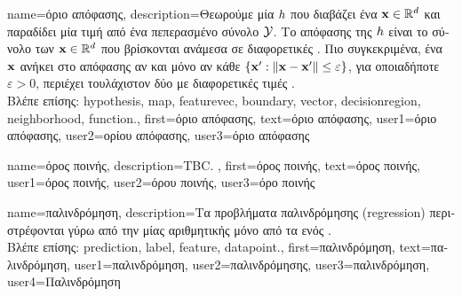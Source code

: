 {name={\foreignlanguage{greek}{όριο απόφασης}}, 
	description={\foreignlanguage{greek}{Θεωρούμε μία}  
		  $h$ \foreignlanguage{greek}{που διαβάζει ένα}   
		${\bf x} \in \mathbb{R}^{d}$ \foreignlanguage{greek}{και παραδίδει μία τιμή από ένα πεπερασμένο σύνολο $\mathcal{Y}$. 
		Το}  \foreignlanguage{greek}{απόφασης της $h$ είναι το σύνολο των}  
		${\bf x} \in \mathbb{R}^{d}$ \foreignlanguage{greek}{που βρίσκονται ανάμεσα σε διαφορετικές} . 
		\foreignlanguage{greek}{Πιο συγκεκριμένα, ένα}  ${\bf x}$ \foreignlanguage{greek}{ανήκει στο} 
		 \foreignlanguage{greek}{απόφασης αν και μόνο αν κάθε}  
		$\{ {\bf x}': \| {\bf x} - {\bf x}' \| \leq \varepsilon \}$, \foreignlanguage{greek}{για οποιαδήποτε $\varepsilon >0$, περιέχει 
		τουλάχιστον δύο}  \foreignlanguage{greek}{με διαφορετικές τιμές} .
		\\
		\foreignlanguage{greek}{Βλέπε επίσης:} \gls{hypothesis}, \gls{map}, \gls{featurevec}, \gls{boundary}, \gls{vector}, \gls{decisionregion}, 
		\gls{neighborhood}, \gls{function}.},
	first={\foreignlanguage{greek}{όριο απόφασης}},
	text={\foreignlanguage{greek}{όριο απόφασης}},
	user1={\foreignlanguage{greek}{όριο απόφασης}}, %
	user2={\foreignlanguage{greek}{ορίου απόφασης}}, %
	user3={\foreignlanguage{greek}{όριο απόφασης}} %
}

{name={\foreignlanguage{greek}{όρος ποινής}},
	description={TBC. },
	first={\foreignlanguage{greek}{όρος ποινής}},
  	text={\foreignlanguage{greek}{όρος ποινής}},
	user1={\foreignlanguage{greek}{όρος ποινής}}, %
	user2={\foreignlanguage{greek}{όρου ποινής}}, %
	user3={\foreignlanguage{greek}{όρο ποινής}} %
}

{name={\foreignlanguage{greek}{παλινδρόμηση}},
	description={\foreignlanguage{greek}{Τα προβλήματα παλινδρόμησης} 
		(regression) \foreignlanguage{greek}{περιστρέφονται γύρω από την}  
		 \foreignlanguage{greek}{μίας αριθμητικής}  \foreignlanguage{greek}{μόνο από τα} 
		 \foreignlanguage{greek}{ενός}  \cite[\foreignlanguage{greek}{Κεφ.} 2]{MLBasics}.
		\\
		\foreignlanguage{greek}{Βλέπε επίσης:} \gls{prediction}, \gls{label}, \gls{feature}, \gls{datapoint}.},
	first={\foreignlanguage{greek}{παλινδρόμηση}},
	text={\foreignlanguage{greek}{παλινδρόμηση}},
	user1={\foreignlanguage{greek}{παλινδρόμηση}}, %
  	user2={\foreignlanguage{greek}{παλινδρόμησης}}, %
	user3={\foreignlanguage{greek}{παλινδρόμηση}}, %
	user4={\foreignlanguage{greek}{Παλινδρόμηση}} %
}

